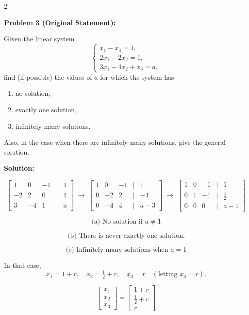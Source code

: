 \documentclass[8pt]{extarticle}
\begin{document}
\begin{multicols}{2}
\begin{tcolorbox}[title=Problem 3 — Original Statement and Solution]
\noindent
\textbf{Problem 3 (Original Statement):}  

Given the linear system
\[
\begin{cases}
x_{1} - x_{3} = 1,\\[4pt]
2x_{1} - 2x_{2} = 1,\\[4pt]
3x_{1} - 4x_{2} + x_{3} = a,
\end{cases}
\]
find (if possible) the values of \(a\) for which the system has  
\begin{enumerate}
\item[(a)] no solution,  
\item[(b)] exactly one solution,  
\item[(c)] infinitely many solutions.  
\end{enumerate}
Also, in the case when there are infinitely many solutions, give the general solution.

\bigskip
\noindent
\textbf{Solution:}

\[
\begin{bmatrix}
1 & 0 & -1 & | & 1\\
-2 & 2 & 0 & | & 1\\
3 & -4 & 1 & | & a
\end{bmatrix}
\;\to\;
\begin{bmatrix}
1 & 0 & -1 & | & 1\\
0 & -2 & 2 & | & -1\\
0 & -4 & 4 & | & a-3
\end{bmatrix}
\;\to\;
\begin{bmatrix}
1 & 0 & -1 & | & 1\\
0 & 1 & -1 & | & \tfrac{1}{2}\\
0 & 0 & 0 & | & a-1
\end{bmatrix}
\]

\[
\text{(a) No solution if } a \ne 1
\]

\[
\text{(b) There is never exactly one solution.}
\]

\[
\text{(c) Infinitely many solutions when } a = 1
\]

In that case,
\[
x_{1} = 1 + r, \quad
x_{2} = \tfrac{1}{2} + r, \quad
x_{3} = r \quad (\text{letting } x_{3} = r).
\]

\[
\begin{bmatrix}
x_{1}\\
x_{2}\\
x_{3}
\end{bmatrix}
=
\begin{bmatrix}
1 + r\\
\tfrac{1}{2} + r\\
r
\end{bmatrix}
\]
\end{tcolorbox}


\end{multicols}
\end{document}
